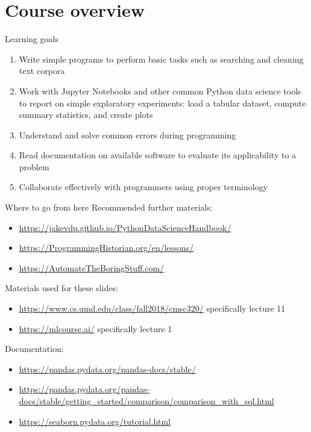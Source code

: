 \documentclass[aspectratio=169,usenames,dvipsnames]{beamer}
\begin{document}
\section{Course overview}
\frame{\tableofcontents[currentsection]}

\begin{frame}{Learning goals}
    \begin{enumerate}
        \item Write simple programs to perform basic tasks such as searching
            and cleaning text corpora
        \item Work with Jupyter Notebooks and other common Python data science
            tools to report on simple exploratory experiments:
            load a tabular dataset, compute summary statistics,
            and create plots
        \item Understand and solve common errors during programming
        \item Read documentation on available software to evaluate its
            applicability to a problem
        \item Collaborate effectively with programmers using proper terminology
    \end{enumerate}
\end{frame}

\begin{frame}{Where to go from here}
    Recommended further materials:
    \begin{itemize}
        \item \url{https://jakevdp.github.io/PythonDataScienceHandbook/}
        \item \url{https://ProgrammingHistorian.org/en/lessons/}
        \item \url{https://AutomateTheBoringStuff.com/}
    \end{itemize}
\end{frame}

\begin{frame}
Materials used for these slides:
\begin{itemize}
\item \url{https://www.cs.umd.edu/class/fall2018/cmsc320/}
    specifically lecture 11
\item \url{https://mlcourse.ai/}
    specifically lecture 1
\end{itemize}

\vspace{1em}
Documentation:
\begin{itemize}
    \item \url{https://pandas.pydata.org/pandas-docs/stable/}
    \item \url{https://pandas.pydata.org/pandas-docs/stable/getting_started/comparison/comparison_with_sql.html}
    \item \url{https://seaborn.pydata.org/tutorial.html}
\end{itemize}
\end{frame}
\end{document}
